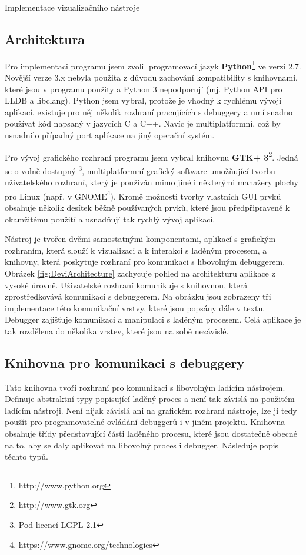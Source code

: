 \documentclass[bc,male,python,dept460]{diploma}						%
\newcommand{\parspace}[1][]{
	\ifthenelse{\isempty{#1}}{\vspace{5mm}}{\vspace{#1}}
	\par
}
\begin{document}
\begin{section}{Implementace vizualizačního nástroje}
	\subsection{Architektura}
	\par Pro implementaci programu jsem zvolil programovací jazyk \textbf{Python}\footnote{http://www.python.org} ve verzi 2.7. Novější verze 3.x nebyla použita
	z důvodu zachování kompatibility s knihovnami, které jsou v programu použity a Python 3 nepodporují (mj. Python API pro LLDB a libclang).
	Python jsem vybral, protože je vhodný k rychlému vývoji aplikací, existuje pro něj několik rozhraní pracujících s debuggery a umí snadno používat
	kód napsaný v jazycích C a C++. Navíc je multiplatformní, což by usnadnilo případný port aplikace na jiný operační systém.
	
	\parspace Pro vývoj grafického rozhraní programu jsem vybral knihovnu \textbf{GTK+ 3}\footnote{http://www.gtk.org}. Jedná se o volně dostupný
	\footnote{Pod licencí LGPL 2.1}, multiplatformní grafický software umožňující tvorbu uživatelského rozhraní, který je používán mimo jiné i
	některými manažery plochy pro Linux (např. v GNOME\footnote{https://www.gnome.org/technologies}). Kromě možnosti tvorby vlastních
	GUI prvků obsahuje několik desítek běžně používaných prvků, které jsou předpřipravené k okamžitému použití a usnadňují tak rychlý vývoj aplikací.
	
	\parspace Nástroj je tvořen dvěmi samostatnými komponentami, aplikací s grafickým rozhraním, která slouží k vizualizaci a k interakci s laděným procesem,
	a knihovny, která poskytuje rozhraní pro komunikaci s libovolným debuggerem. Obrázek \ref{fig:DeviArchitecture} zachycuje pohled na architekturu aplikace
	z vysoké úrovně.
	Uživatelské rozhraní komunikuje s knihovnou, která zprostředkovává komunikaci s debuggerem. Na obrázku jsou zobrazeny tři implementace této komunikační vrstvy,
	které jsou popsány dále v textu. Debugger zajišťuje komunikaci a manipulaci s laděným procesem. Celá aplikace je tak rozdělena do několika
	vrstev, které jsou na sobě nezávislé.
	
		
	\subsection{Knihovna pro komunikaci s debuggery}
	\label{sec:DebuggerApi}
		Tato knihovna tvoří rozhraní pro komunikaci s libovolným ladícím nástrojem. Definuje abstraktní typy popisující laděný proces a není tak závislá na
		použitém ladícím nástroji. Není nijak závislá ani na grafickém rozhraní nástroje, lze ji tedy použít pro programovatelné ovládání debuggerů i v jiném
		projektu. Knihovna obsahuje třídy představující části laděného procesu, které jsou dostatečně obecné na to, aby se daly aplikovat na libovolný
		proces i debugger. Následuje popis těchto typů.
		

\end{section}
\end{document}
